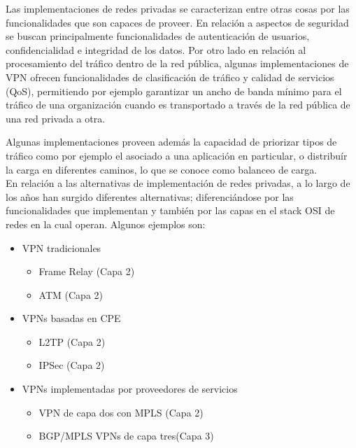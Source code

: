 Las implementaciones de redes privadas se caracterizan entre otras cosas por las funcionalidades que son capaces de proveer. En relaci\'on a aspectos de seguridad se buscan principalmente funcionalidades de autenticaci\'on de usuarios, confidencialidad e integridad de los datos. Por otro lado en relaci\'on al procesamiento del tr\'afico dentro de la red p\'ublica, algunas implementaciones de VPN ofrecen funcionalidades de clasificaci\'on de tr\'afico y calidad de servicios (QoS), permitiendo por ejemplo garantizar un ancho de banda m\'inimo para el tr\'afico de una organizaci\'on cuando es transportado a trav\'es de la red p\'ublica de una red privada a otra. 

Algunas implementaciones proveen adem\'as la capacidad de priorizar tipos de tr\'afico como por ejemplo el asociado a una aplicaci\'on en particular, o distribu\'ir la carga en diferentes caminos, lo que se conoce como balanceo de carga.\\


En relaci\'on a las alternativas de implementaci\'on de redes privadas, a lo largo de los años han surgido diferentes alternativas; diferenciándose por las funcionalidades que implementan y tambi\'en por las capas en el stack OSI de redes en la cual operan. Algunos ejemplos son: 

\begin{itemize}
\item VPN tradicionales
	\begin{itemize}
	\item Frame Relay (Capa 2)	
	\item ATM (Capa 2)
	\end{itemize}
	
\item VPNs basadas en CPE
	\begin{itemize}
	\item L2TP (Capa 2)
	\item IPSec (Capa 2)
	\end{itemize}
	
\item VPNs implementadas por proveedores de servicios
	\begin{itemize}
	\item VPN de capa dos con MPLS (Capa 2)
	\item BGP/MPLS VPNs de capa tres(Capa 3)
	\end{itemize}
\end{itemize}

